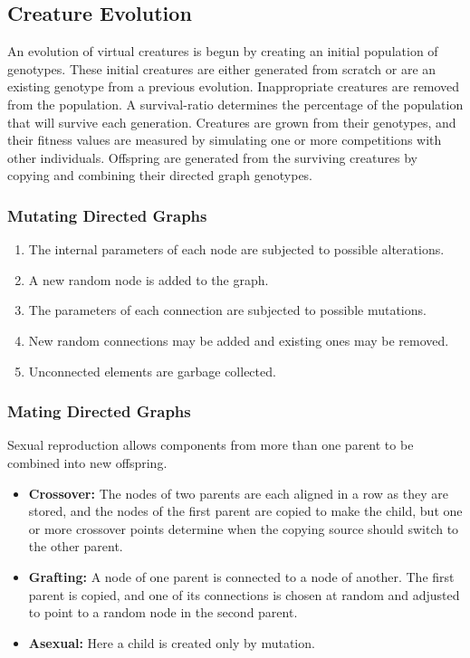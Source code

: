 \documentclass[../main.tex]{subfiles}
\begin{document}
\subsection{Creature Evolution}

An evolution of virtual creatures is begun by creating an initial population of genotypes. These initial creatures are
either generated from scratch or are an existing genotype from a previous evolution.  Inappropriate creatures are
removed from the population. A survival-ratio determines the percentage of the population that will survive each
generation. Creatures are grown from their genotypes, and their fitness values are measured by simulating one or more
competitions with other individuals. Offspring are generated from the surviving creatures by copying and combining
their directed graph genotypes.

\subsubsection{Mutating Directed Graphs}

\begin{enumerate}
	\item The internal parameters of each node are subjected to possible alterations.
	\item A new random node is added to the graph.
	\item The parameters of each connection are subjected to possible mutations.
	\item New random connections may be added and existing ones may be removed.
	\item Unconnected elements are garbage collected.
\end{enumerate}

\subsubsection{Mating Directed Graphs}

Sexual reproduction allows components from more than one parent to be combined into new offspring.

\begin{itemize}
	\item \textbf{Crossover:} The nodes of two parents are each aligned in a row as they are stored, and the nodes of
	the first parent are copied to make the child, but one or more crossover points determine when the copying source
	should switch to the other parent.
	\item \textbf{Grafting:} A node of one parent is connected to a node of another.  The first parent is copied, and
	one of its connections is chosen at random and adjusted to point to a random node in the second parent.
	\item \textbf{Asexual:} Here a child is created only by mutation.
\end{itemize}
\end{document}
